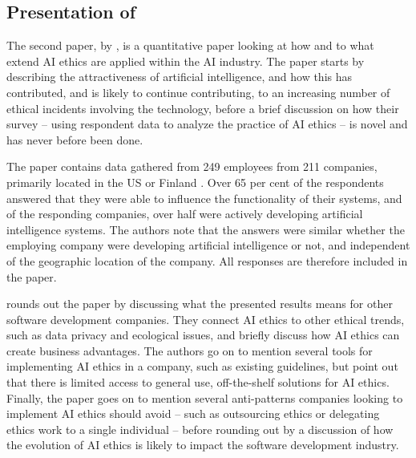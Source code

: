 \subsection[Presentation of Vakkuri et al. (2020)]{Presentation of \textcite{Vakkuri_2020}}
\label{sec:vakkuri-presentation}
The second paper,  by \textcite{Vakkuri_2020}, is a quantitative paper looking at how and to what extend AI ethics are applied within the AI industry. The paper starts by describing the attractiveness of artificial intelligence, and how this has contributed, and is likely to continue contributing, to an increasing number of ethical incidents involving the technology, before a brief discussion on how their survey -- using respondent data to analyze the practice of AI ethics -- is novel and has never before been done.

The paper contains data gathered from 249 employees from 211 companies, primarily located in the US or Finland \parencite[p.52]{Vakkuri_2020}. Over 65 per cent of the respondents answered that they were able to influence the functionality of their systems, and of the responding companies, over half were actively developing artificial intelligence systems. The authors note that the answers were similar whether the employing company were developing artificial intelligence or not, and independent of the geographic location of the company. All responses are therefore included in the paper.

\textcite{Vakkuri_2020} rounds out the paper by discussing what the presented results means for other software development companies. They connect AI ethics to other ethical trends, such as data privacy and ecological issues, and briefly discuss how AI ethics can create business advantages. The authors go on to mention several tools for implementing AI ethics in a company, such as existing guidelines, but point out that there is limited access to general use, off-the-shelf solutions for AI ethics. Finally, the paper goes on to mention several anti-patterns companies looking to implement AI ethics should avoid -- such as outsourcing ethics or delegating ethics work to a single individual -- before rounding out by a discussion of how the evolution of AI ethics is likely to impact the software development industry.



